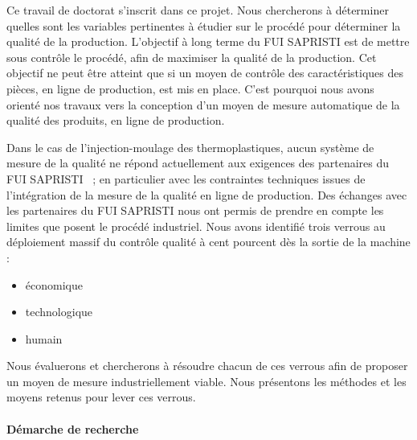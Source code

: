 Ce travail de doctorat s'inscrit dans ce projet.
Nous chercherons à déterminer quelles sont les variables pertinentes à étudier sur le procédé pour déterminer la qualité de la production.
L'objectif à long terme du FUI SAPRISTI est de mettre sous contrôle le procédé, afin de maximiser la qualité de la production.
Cet objectif ne peut être atteint que si un moyen de contrôle des caractéristiques des pièces, en ligne de production, est mis en place.
C'est pourquoi nous avons orienté nos travaux vers la conception d'un moyen de mesure automatique de la qualité des produits, en ligne de production.

Dans le cas de l’injection-moulage des thermoplastiques, aucun système de mesure de la qualité ne répond actuellement aux exigences des partenaires du FUI SAPRISTI \ ; en particulier avec les contraintes techniques issues de l'intégration de la mesure de la qualité en ligne de production.
Des échanges avec les partenaires du FUI SAPRISTI nous ont permis de prendre en compte les limites que posent le procédé industriel.
Nous avons identifié trois verrous au déploiement massif du contrôle qualité à cent pourcent dès la sortie de la machine :
\begin{itemize}
	\item économique
	\item technologique
	\item humain
\end{itemize}
Nous évaluerons et chercherons à résoudre chacun de ces verrous afin de proposer un moyen de mesure industriellement viable.
Nous présentons les méthodes et les moyens retenus pour lever ces verrous.

\bigskip
\paragraph{Démarche de recherche}\mbox{} \\


